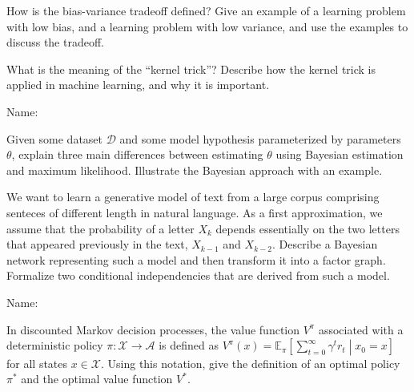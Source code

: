 \documentclass[11pt]{article}
\newcounter{marks}
\begin{document}
\begin{list}{{\bf Question :}}
\framebox[16cm][l]{ 
\parbox{15.9cm}{
\vspace*{5cm}
}}

\item
{}
\addtocounter{marks}{1}
How is the bias-variance tradeoff defined? Give an example of a learning problem with low bias, and a learning problem with low variance, and use the examples to discuss the tradeoff.

\framebox[16cm][l]{ 
\parbox{15.9cm}{
\vspace*{5cm}
}}

\item
{}
\addtocounter{marks}{1}
What is the meaning of the ``kernel trick''? Describe how the kernel trick is applied in machine learning, and why it is important.

\framebox[16cm][l]{ 
\parbox{15.9cm}{
\vspace*{5cm}
}}



\pagebreak

Name: \dotfill

\item
{}
\addtocounter{marks}{1}
Given some dataset $\mathcal{D}$ and some model hypothesis parameterized by parameters~$\theta$, explain three main differences between estimating $\theta$ using Bayesian estimation and maximum likelihood. Illustrate the Bayesian approach with an example.

\framebox[16cm][l]{ 
\parbox{15.9cm}{
\vspace*{9cm}
}}

\item
{}
\addtocounter{marks}{1}
We want to learn a generative model of text from a large corpus comprising senteces of different length in natural language.
As a first approximation, we assume that the probability of a letter $X_k$ depends essentially on the two letters that appeared previously in the text, $X_{k-1}$ and $X_{k-2}$. Describe a Bayesian network representing such a model and then transform it into a factor graph.
Formalize two conditional independencies that are derived from such a model.

\framebox[16cm][l]{ 
\parbox{15.9cm}{
\vspace*{9cm}
}}



\pagebreak

Name: \dotfill

\item
{}
\addtocounter{marks}{1}
In discounted Markov decision processes, the value function $V^\pi$ associated with a deterministic policy $\pi:\mathcal{X}\rightarrow \mathcal{A}$ is defined as $V^\pi(x) = \mathbb{E}_\pi\left[\sum_{t=0}^\infty \gamma^t r_t\middle| x_0 = x\right]$
for all states $x\in\mathcal{X}$. Using this notation, give the definition of an optimal policy $\pi^*$ and the optimal value function $V^*$.


\end{list}
\end{document}
